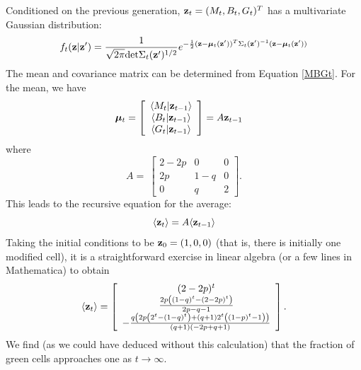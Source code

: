 \documentclass{article}
\newcommand{\bz}{{\bf z}}
\newcommand{\bmu}{{\boldsymbol \mu}}
\begin{document}
Conditioned on the previous generation, ${\bf z}_t = (M_t,B_t,G_t)^T$ has a multivariate Gaussian distribution: 
\begin{align}
f_t(\bz|\bz') = \frac{1}{\sqrt{2\pi } {\rm det}\Sigma_{t}(\bz')^{1/2}} e^{-\frac{1}{2}(\bz-\bmu_{t}(\bz'))^T\Sigma_{t}(\bz')^{-1}(\bz-\bmu_{t}(\bz'))}
\end{align}
The mean and covariance matrix can be determined from Equation \eqref{MBGt}. For the mean, we have
\begin{align}
\bmu_{t} &= \left[\begin{array}{c}
 \langle  M_t |\bz_{t-1}\rangle \\
 \langle  B_t |\bz_{t-1}\rangle \\
 \langle  G_t |\bz_{t-1}\rangle 
 \end{array}
\right]
= A \bz_{t-1} 
\end{align}
where
\begin{equation}
A=\
\left[ \begin{array}{ccc}
2 -2p & 0 &0 \\
2p & 1-q & 0 \\
0 & q & 2
\end{array}\right].
\end{equation}
This leads to the recursive equation for the average:  
\begin{equation}
\langle \bz_t \rangle  = A \langle \bz_{t-1} \rangle 
\end{equation}
Taking the initial conditions to be $\bz_0 = (1,0,0)$ (that is, there is initially one modified cell), it is a straightforward exercise in linear algebra (or a few lines in Mathematica) to obtain 
\begin{equation}
\langle \bz_t \rangle  = \left[
\begin{array}{c}
 (2-2 p)^t \\
 \frac{2 p \left((1-q)^t-(2-2 p)^t\right)}{2 p-q-1} \\
 -\frac{q \left(2 p \left(2^t-(1-q)^t\right)+(q+1) 2^t \left((1-p)^t-1\right)\right)}{(q+1) (-2 p+q+1)} \\
\end{array}
\right].
\end{equation}
We find (as we could have deduced without this calculation) that the fraction of green cells approaches one as $t \to \infty$. 
\end{document}
